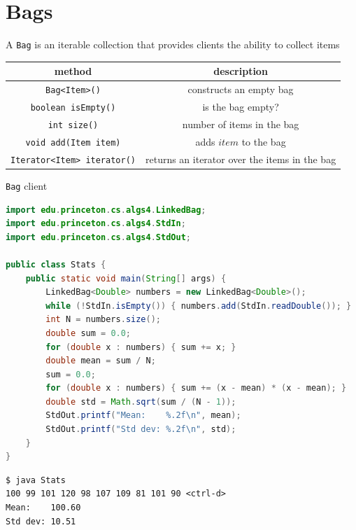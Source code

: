 \documentclass[8pt,a4paper,compress]{beamer}
\begin{document}
\section{Bags}
\begin{frame}[fragile]
A \lstinline{Bag} is an iterable collection that provides clients the ability to collect items
\begin{center}
\begin{tabular}{cc}
method & description \\ \hline
\lstinline$Bag<Item>()$ & constructs an empty bag \\
\lstinline$boolean isEmpty()$ & is the bag empty? \\
\lstinline$int size()$ & number of items in the bag \\
\lstinline$void add(Item item)$ & adds $item$ to the bag \\
\lstinline$Iterator<Item> iterator()$ & returns an iterator over the items in the bag
\end{tabular} 
\end{center}

\lstinline{Bag} client
\begin{lstlisting}[language=Java]
import edu.princeton.cs.algs4.LinkedBag;
import edu.princeton.cs.algs4.StdIn;
import edu.princeton.cs.algs4.StdOut;

public class Stats {
    public static void main(String[] args) {
        LinkedBag<Double> numbers = new LinkedBag<Double>();
        while (!StdIn.isEmpty()) { numbers.add(StdIn.readDouble()); }
        int N = numbers.size();
        double sum = 0.0;
        for (double x : numbers) { sum += x; }
        double mean = sum / N;
        sum = 0.0;
        for (double x : numbers) { sum += (x - mean) * (x - mean); }
        double std = Math.sqrt(sum / (N - 1));
        StdOut.printf("Mean:    %.2f\n", mean);
        StdOut.printf("Std dev: %.2f\n", std);
    }
}
\end{lstlisting}

\begin{lstlisting}[language={}]
$ java Stats
100 99 101 120 98 107 109 81 101 90 <ctrl-d>
Mean:    100.60
Std dev: 10.51
\end{lstlisting}
\end{frame}
\end{document}
